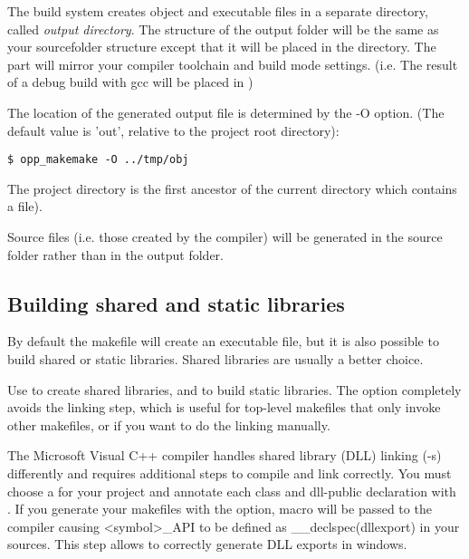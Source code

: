 The build system creates object and executable files in a separate directory, called
\textit{output directory}. The structure of the output folder will be the same as your
sourcefolder structure except that it will be placed in the  directory.
The  part will mirror your compiler toolchain and build mode settings.
(i.e. The result of a debug build with gcc will be placed in )


The location of the generated output file is determined by the -O option.
(The default value is 'out', relative to the project root directory):


\begin{verbatim}
$ opp_makemake -O ../tmp/obj
\end{verbatim}


\begin{note}
The project directory is the first ancestor of the current directory which
contains a  file).
\end{note}


\begin{note}
Source files (i.e. those created by the  compiler) will be generated in the
source folder rather than in the output folder.
\end{note}


\subsection{Building shared and static libraries}

By default the makefile will create an executable file, but it is also
possible to build shared or static libraries. Shared libraries
are usually a better choice.

Use  to create shared libraries, and 
to build static libraries. The  option completely avoids
the linking step, which is useful for top-level makefiles that only invoke
other makefiles, or if you want to do the linking manually.

\ifcommercial
\begin{note}
The Microsoft Visual C++ compiler handles shared library (DLL) linking (-s)
differently and requires additional steps to compile and link correctly.
You must choose a  for your project and annotate each class
and dll-public declaration with . If you generate your makefiles
with the  option,  macro will be passed to
the compiler causing <symbol>_API to be defined as __declspec(dllexport) in
your sources. This step allows to correctly generate DLL exports in windows.
\end{note}
\fi


